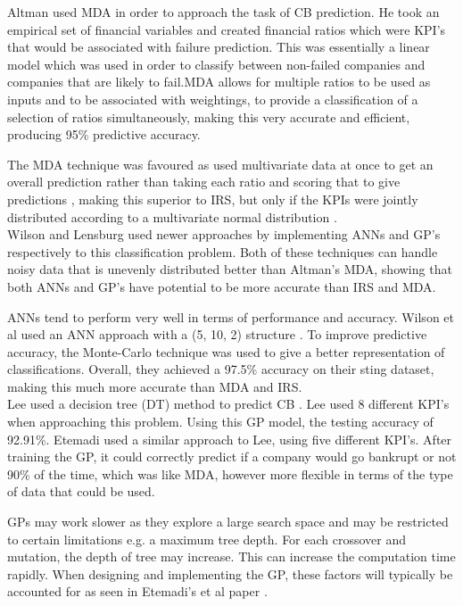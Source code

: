 \documentclass[11pt]{article}
\begin{document}
Altman used MDA in order to approach the task of CB prediction. He took an empirical set of financial variables and created financial ratios which were KPI's that would be associated with failure prediction. This was essentially a linear model which was used in order to classify between non-failed companies and companies that are likely to fail.MDA allows for multiple ratios to be used as inputs and to be associated with weightings, to provide a classification of a selection of ratios simultaneously, making this very accurate and efficient, producing 95\% predictive accuracy. 

The MDA technique was favoured as used multivariate data at once to get an overall prediction rather than taking each ratio and scoring that to give predictions \cite{ref-six}, making this superior to IRS, but only if the KPIs were jointly distributed according to a multivariate normal distribution \cite{ref-nine}. \\
Wilson  \cite{ref-nine} and Lensburg \cite{ref-ten} used newer approaches by implementing ANNs and GP's respectively to this classification problem. Both of these techniques can handle noisy data that is unevenly distributed better than Altman's MDA, showing that both ANNs and GP's have potential to be more accurate than IRS and MDA. 

ANNs tend to perform very well in terms of performance and accuracy. Wilson et al used an ANN approach with a (5, 10, 2) structure \cite{ref-nine}. To improve predictive accuracy, the Monte-Carlo technique was used to give a better representation of classifications. Overall, they achieved a 97.5\% accuracy on their sting dataset, making this much more accurate than MDA and IRS. \\
Lee used a decision tree (DT) method to predict CB \cite{ref-eleven}. Lee used 8 different KPI's when approaching this problem. Using this GP model, the testing accuracy of 92.91\%. Etemadi \cite{ref-twelve} used a similar approach to Lee, using five different KPI's. After training the GP, it could correctly predict if a company would go bankrupt or not 90\% of the time, which was like MDA, however more flexible in terms of the type of data that could be used.

GPs may work slower as they explore a large search space and may be restricted to certain limitations e.g. a maximum tree depth. For each crossover and mutation, the depth of tree may increase. This can increase the computation time rapidly. When designing and implementing the GP, these factors will typically be accounted for as seen in Etemadi's et al paper \cite{ref-twelve}. \\
\end{document}
